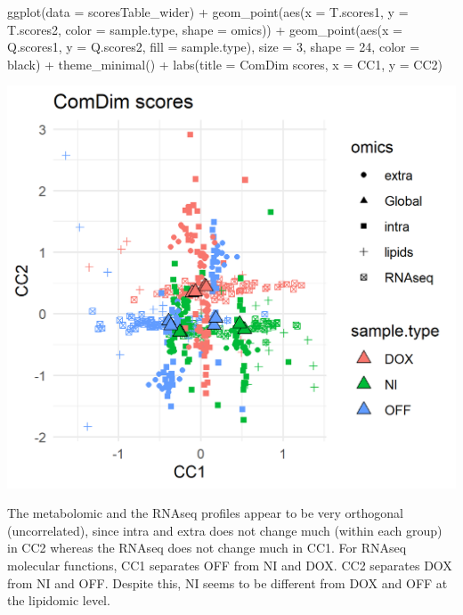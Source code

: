 \documentclass[
]{book}
\newenvironment{Shaded}{\begin{snugshade}}{\end{snugshade}}
\newcommand{\AttributeTok}[1]{\textcolor[rgb]{0.77,0.63,0.00}{#1}}
\newcommand{\DecValTok}[1]{\textcolor[rgb]{0.00,0.00,0.81}{#1}}
\newcommand{\FunctionTok}[1]{\textcolor[rgb]{0.00,0.00,0.00}{#1}}
\newcommand{\NormalTok}[1]{#1}
\newcommand{\SpecialCharTok}[1]{\textcolor[rgb]{0.00,0.00,0.00}{#1}}
\newcommand{\StringTok}[1]{\textcolor[rgb]{0.31,0.60,0.02}{#1}}
\begin{document}
\begin{Shaded}
\begin{Highlighting}[]
  \FunctionTok{ggplot}\NormalTok{(}\AttributeTok{data =}\NormalTok{ scoresTable\_wider) }\SpecialCharTok{+}
    \FunctionTok{geom\_point}\NormalTok{(}\FunctionTok{aes}\NormalTok{(}\AttributeTok{x =}\NormalTok{ T.scores1, }\AttributeTok{y =}\NormalTok{ T.scores2, }\AttributeTok{color =}\NormalTok{ sample.type, }\AttributeTok{shape =}\NormalTok{ omics)) }\SpecialCharTok{+}
    \FunctionTok{geom\_point}\NormalTok{(}\FunctionTok{aes}\NormalTok{(}\AttributeTok{x =}\NormalTok{ Q.scores1, }\AttributeTok{y =}\NormalTok{ Q.scores2, }\AttributeTok{fill =}\NormalTok{ sample.type),}
               \AttributeTok{size =} \DecValTok{3}\NormalTok{, }\AttributeTok{shape =} \DecValTok{24}\NormalTok{, }\AttributeTok{color =} \StringTok{\textquotesingle{}black\textquotesingle{}}\NormalTok{) }\SpecialCharTok{+}
    \FunctionTok{theme\_minimal}\NormalTok{() }\SpecialCharTok{+}
    \FunctionTok{labs}\NormalTok{(}\AttributeTok{title =} \StringTok{\textquotesingle{}ComDim scores\textquotesingle{}}\NormalTok{, }\AttributeTok{x =} \StringTok{\textquotesingle{}CC1\textquotesingle{}}\NormalTok{, }\AttributeTok{y =} \StringTok{\textquotesingle{}CC2\textquotesingle{}}\NormalTok{)}
\end{Highlighting}
\end{Shaded}

\includegraphics{Figs/fig5_1.png}

The metabolomic and the RNAseq profiles appear to be very orthogonal
(uncorrelated), since intra and extra does not change much (within each group)
in CC2 whereas the RNAseq does not change much in CC1.
For RNAseq molecular functions, CC1 separates OFF from NI and DOX.
CC2 separates DOX from NI and OFF.
Despite this, NI seems to be different from DOX and OFF at the lipidomic level.
\end{document}
